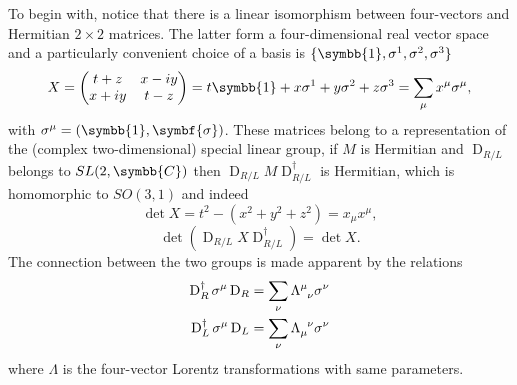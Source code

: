 To begin with, notice that there is a linear isomorphism between four-vectors and Hermitian $2 \times 2$ matrices. The latter form a four-dimensional real vector space and a particularly convenient choice of a basis is $\{ \symbb{1}, \sigma^1, \sigma^2, \sigma^3 \}$
\begin{equation}
  X = 
  \begin{pmatrix}
    t + z & x - i y \\
    x + i y & t - z
  \end{pmatrix}
  = t \symbb{1} + x \sigma^1 + y \sigma^2 + z \sigma^3 = \sum_\mu x^\mu \sigma^\mu ,
\end{equation}
with $\sigma^\mu = (\symbb{1}, \symbf{\sigma})$. These matrices belong to a representation of the (complex two-dimensional) special linear group, if $M$ is Hermitian and $\operatorname{D}_{R/L}$ belongs to $SL(2, \symbb{C})$ then $\operatorname{D}_{R/L} M \operatorname{D}^\dagger_{R/L}$ is Hermitian, which is homomorphic to $SO(3,1)$ and indeed 
\begin{equation}
  \det{X} = t^2 - \left( x^2 + y^2 + z^2 \right) = x_\mu x^\mu ,
\end{equation}
\begin{equation}
  \det{\left( \operatorname{D}_{R/L}X \operatorname{D}^\dagger_{R/L}\right)} = \det X .
\end{equation}
The connection between the two groups is made apparent by the relations
\begin{subequations}
  \begin{align}
    \operatorname{D}^\dagger_R \sigma^\mu \operatorname{D}_R = \sum_\nu \Lambda\indices{^\mu_\nu} \sigma^\nu \\
    \operatorname{D}^\dagger_L \sigma^\mu \operatorname{D}_L = \sum_\nu \Lambda\indices{_\mu^\nu} \sigma^\nu 
  \end{align}
  \label{eq:sigma_sandwich}
\end{subequations}
where $\Lambda$ is the four-vector Lorentz transformations with same parameters.

